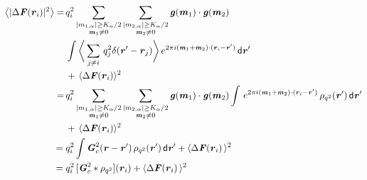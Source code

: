 \documentclass[aps,pre,preprint]{revtex4-1}
\renewcommand{\v}[1]{\textbf{\textit{#1}}}
\renewcommand{\d}[1]{\textsf{#1}}
\begin{document}
\begin{align}\nonumber
  \big\langle
  \vert\Delta\v F(\v r_i)\vert^2
  \big\rangle
  = \,&
  q^2_i
  \sum_{
    \begin{subarray}{c}
      \vert m_{1,\alpha}\vert \geq K_\alpha/2\\
      \v m_1\neq 0
    \end{subarray}}
  \sum_{
    \begin{subarray}{c}
      \vert m_{2,\alpha}\vert \geq K_\alpha/2\\
      \v m_2\neq 0
    \end{subarray}}
  \v g(\v m_1)\cdot\v g(\v m_2) \\\nonumber
  \,&
  \int
  \bigg\langle
  \sum_{j\neq i}\,q_j^2
  \delta (\v r' - \v r_j)
  \bigg\rangle
  \,e^{2\pi i(\v m_1 + \v m_2)\cdot(\v r_i - \v r')}
  \,\d d\v r' \\ \nonumber
  &+\,
  \langle\Delta\v F(\v r_i)\rangle^2 \\ \nonumber
  =\,&
  q^2_i
  \sum_{
    \begin{subarray}{c}
      \vert m_{1,\alpha}\vert \geq K_\alpha/2\\
      \v m_1\neq 0
    \end{subarray}}
  \sum_{
    \begin{subarray}{c}
      \vert m_{2,\alpha}\vert \geq K_\alpha/2\\
      \v m_2\neq 0
    \end{subarray}}
  \v g(\v m_1)\cdot\v g(\v m_2) 
  \int
  \,e^{2\pi i(\v m_1 + \v m_2)\cdot(\v r_i - \v r')}
  \,\rho_{q^2}(\v r')
  \,\d d\v r' \\  \nonumber
  &+\,
  \langle\Delta\v F(\v r_i)\rangle^2 \\ 
  =\;&
  q^2_i
  \int \v G^2_c(\v r - \v r')\,\rho_{q^2}(\v r')\,\d d\v r'  
  + 
  \langle\Delta\v F(\v r_i)\,\rangle^2 \\
  =\;&
  q_i^2\,[\v G_c^2\ast\rho_{q^2}] (\v r_i) + \langle\Delta\v F(\v r_i)\,\rangle^2 
\end{align}





{}

\end{document}
